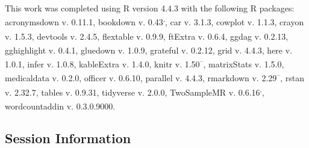 \documentclass[
]{article}
\begin{document}
This work was completed using R version 4.4.3\textsuperscript{} with the following R packages: acronymsdown v. 0.11.1\textsuperscript{}, bookdown v. 0.43\textsuperscript{,}, car v. 3.1.3\textsuperscript{}, cowplot v. 1.1.3\textsuperscript{}, crayon v. 1.5.3\textsuperscript{}, devtools v. 2.4.5\textsuperscript{}, flextable v. 0.9.9\textsuperscript{}, ftExtra v. 0.6.4\textsuperscript{}, ggdag v. 0.2.13\textsuperscript{}, gghighlight v. 0.4.1\textsuperscript{}, gluedown v. 1.0.9\textsuperscript{}, grateful v. 0.2.12\textsuperscript{}, grid v. 4.4.3\textsuperscript{}, here v. 1.0.1\textsuperscript{}, infer v. 1.0.8\textsuperscript{}, kableExtra v. 1.4.0\textsuperscript{}, knitr v. 1.50\textsuperscript{--}, matrixStats v. 1.5.0\textsuperscript{}, medicaldata v. 0.2.0\textsuperscript{}, officer v. 0.6.10\textsuperscript{}, parallel v. 4.4.3\textsuperscript{}, rmarkdown v. 2.29\textsuperscript{--}, rstan v. 2.32.7\textsuperscript{}, tables v. 0.9.31\textsuperscript{}, tidyverse v. 2.0.0\textsuperscript{}, TwoSampleMR v. 0.6.16\textsuperscript{,}, wordcountaddin v. 0.3.0.9000\textsuperscript{}.

\subsection{Session Information}\label{session-information}
\end{document}
